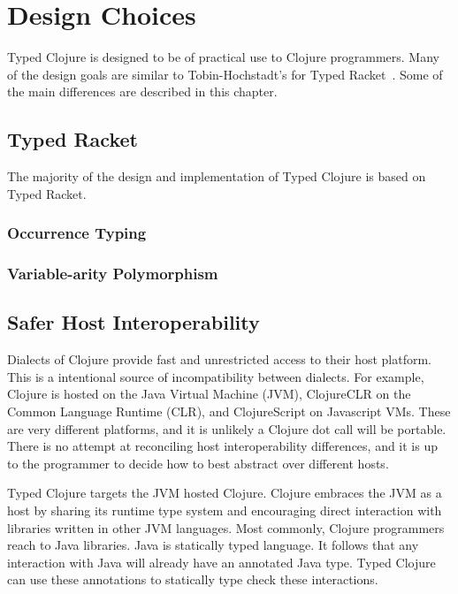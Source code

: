 \chapter{Design Choices}

Typed Clojure is designed to be of practical use to Clojure programmers.
Many of the design goals are similar to Tobin-Hochstadt's 
for Typed Racket~\cite{Tob10}. Some of the main differences are described in this chapter.

\section{Typed Racket}

The majority of the design and implementation of Typed Clojure is based on Typed Racket.

\subsection{Occurrence Typing}

\subsection{Variable-arity Polymorphism}

\section{Safer Host Interoperability}

Dialects of Clojure provide fast and unrestricted access to their host platform. 
This is a intentional source of incompatibility between dialects.
For example, Clojure is hosted on the Java Virtual Machine (JVM), ClojureCLR on the Common Language Runtime (CLR),
and ClojureScript on Javascript VMs. These are very different platforms, and it is unlikely
a Clojure dot call will be portable. There is no attempt at reconciling
host interoperability differences, and it is up to the programmer to decide
how to best abstract over different hosts.

Typed Clojure targets the JVM hosted Clojure.
Clojure embraces the JVM as a host by sharing its runtime type system and encouraging direct
interaction with libraries written in other JVM languages. Most commonly, Clojure programmers
reach to Java libraries. Java is statically typed language. It follows that any interaction with
Java will already have an annotated Java type. Typed Clojure can use these annotations
to statically type check these interactions.


